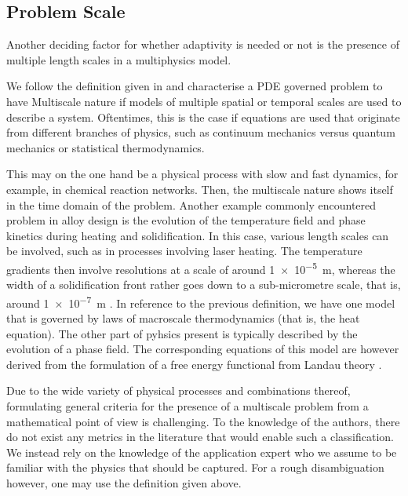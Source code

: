 \documentclass[sn-mathphys,Numbered]{sn-jnl}%
\theoremstyle{thmstyleone}%
\theoremstyle{thmstyletwo}%
\theoremstyle{thmstylethree}%
\begin{document}
\subsection{Problem Scale}\label{sec:problem-scale}

Another deciding factor for whether adaptivity is needed or not is the presence of multiple length scales in a multiphysics model.

We follow the definition given in \cite{eMultiscaleModeling2011,ePrinciplesMultiscaleModeling2011a} and characterise a PDE governed problem to have Multiscale nature if models of multiple spatial or temporal scales are used to describe a system.
Oftentimes, this is the case if equations are used that originate from different branches of physics, such as continuum mechanics versus quantum mechanics or statistical thermodynamics.

This may on the one hand be a physical process with slow and fast dynamics, for example, in chemical reaction networks.
Then, the multiscale nature shows itself in the time domain of the problem.
Another example commonly encountered problem in alloy design is the evolution of the temperature field and phase kinetics during heating and solidification.
In this case, various length scales can be involved, such as in processes involving laser heating.
The temperature gradients then involve resolutions at a scale of around \SI{1e-5}{\metre}, whereas the width of a solidification front rather goes down to a sub-micrometre scale, that is, around \SI{1e-7}{\metre} \cite{zimbrodModellingMicrostructuresInsitu2021}.
In reference to the previous definition, we have one model that is governed by laws of macroscale thermodynamics (that is,  the heat equation).
The other part of pyhsics present is typically described by the evolution of a phase field.
The corresponding equations of this model are however derived from the formulation of a free energy functional from Landau theory \cite{landauTheoryPhaseTransitions1937}.

Due to the wide variety of physical processes and combinations thereof, formulating general criteria for the presence of a multiscale problem from a mathematical point of view is challenging.
To the knowledge of the authors, there do not exist any metrics in the literature that would enable such a classification.
We instead rely on the knowledge of the application expert who we assume to be familiar with the physics that should be captured.
For a rough disambiguation however, one may use the definition given above.
\end{document}
